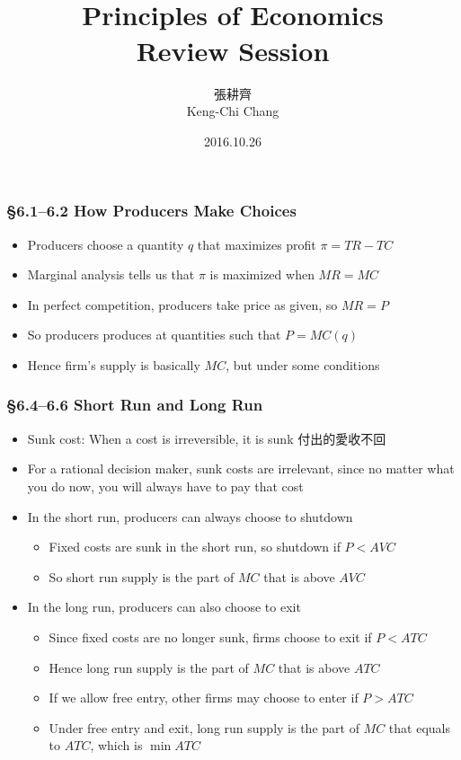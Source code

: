 \documentclass[12pt, xcolor=dvipsnames]{beamer}
\title{\bf{\Huge {}\\[-2mm] Principles of Economics \\[2mm] Review Session}}
\author{{\Large 張耕齊\\[2mm] Keng-Chi Chang}}
\institute{{}\\[-7mm]\footnotesize\tt{<r03323070@ntu.edu.tw>}\\[2mm]}
\date{\large 2016.10.26}
\begin{document}
\fontsize{12}{14pt}\selectfont

\begin{frame}
\titlepage
\end{frame}

\begin{frame}
\frametitle{\bf §6.1--6.2 How Producers Make Choices}
\begin{itemize}
	\item Producers choose a quantity $q$ that maximizes profit $\pi=TR-TC$
	\item Marginal analysis tells us that $\pi$ is maximized when $MR=MC$
	\item In perfect competition, producers take price as given, so $MR=P$
	\item So producers produces at quantities such that $P=MC(q)$
	\item Hence firm's supply is basically $MC$, but under some conditions
\end{itemize}
\end{frame}

\begin{frame}
\frametitle{\bf §6.4--6.6 Short Run and Long Run}
\begin{itemize}
	\item Sunk cost: When a cost is irreversible, it is sunk 付出的愛收不回
	\item For a rational decision maker, sunk costs are irrelevant, since no matter what you do now, you will always have to pay that cost 
	\item In the short run, producers can always choose to shutdown
	\begin{itemize}
		\item Fixed costs are sunk in the short run, so shutdown if $P<AVC$
		\item So short run supply is the part of $MC$ that is above $AVC$
	\end{itemize}
	\item In the long run, producers can also choose to exit
	\begin{itemize}
		\item Since fixed costs are no longer sunk, firms choose to exit if $P<ATC$
		\item Hence long run supply is the part of $MC$ that is above $ATC$
		\item If we allow free entry, other firms may choose to enter if $P>ATC$
		\item Under free entry and exit, long run supply is the part of $MC$ that equals to $ATC$, which is $\min ATC$
	\end{itemize}
\end{itemize}
\end{frame}
\end{document}
